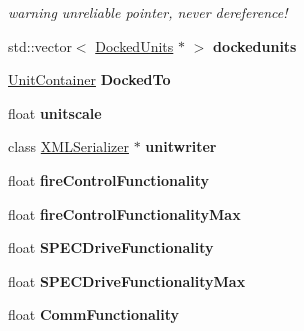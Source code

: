 \begin{DoxyCompactItemize}
\begin{DoxyCompactList}\small\item\em warning unreliable pointer, never dereference! \end{DoxyCompactList}\item 
std\+::vector$<$ \hyperlink{structDockedUnits}{Docked\+Units} $\ast$ $>$ {\bfseries dockedunits}\hypertarget{structUnitImages_a0eb0c2ab5d1f0ee4d1c61d615475e4b4}{}\label{structUnitImages_a0eb0c2ab5d1f0ee4d1c61d615475e4b4}

\item 
\hyperlink{classUnitContainer}{Unit\+Container} {\bfseries Docked\+To}\hypertarget{structUnitImages_aecd497459e4b297cb13e07401261b3c5}{}\label{structUnitImages_aecd497459e4b297cb13e07401261b3c5}

\item 
float {\bfseries unitscale}\hypertarget{structUnitImages_a2129d8a268cee4d0374fa4c8d9eaf706}{}\label{structUnitImages_a2129d8a268cee4d0374fa4c8d9eaf706}

\item 
class \hyperlink{classXMLSerializer}{X\+M\+L\+Serializer} $\ast$ {\bfseries unitwriter}\hypertarget{structUnitImages_a1cc39228a4f621a7e064df0c4a04534f}{}\label{structUnitImages_a1cc39228a4f621a7e064df0c4a04534f}

\item 
float {\bfseries fire\+Control\+Functionality}\hypertarget{structUnitImages_ac2c6bf9e4375f856a95343448c6bf44f}{}\label{structUnitImages_ac2c6bf9e4375f856a95343448c6bf44f}

\item 
float {\bfseries fire\+Control\+Functionality\+Max}\hypertarget{structUnitImages_a9912882ece3eea22f509980415a80290}{}\label{structUnitImages_a9912882ece3eea22f509980415a80290}

\item 
float {\bfseries S\+P\+E\+C\+Drive\+Functionality}\hypertarget{structUnitImages_a81ca22be47df69423c98f189f0126286}{}\label{structUnitImages_a81ca22be47df69423c98f189f0126286}

\item 
float {\bfseries S\+P\+E\+C\+Drive\+Functionality\+Max}\hypertarget{structUnitImages_a914b8f43f2d6ded13814962f040300d0}{}\label{structUnitImages_a914b8f43f2d6ded13814962f040300d0}

\item 
float {\bfseries Comm\+Functionality}\hypertarget{structUnitImages_a56b847139acb61a6fd29508cbe95f384}{}\label{structUnitImages_a56b847139acb61a6fd29508cbe95f384}


\end{DoxyCompactItemize}
